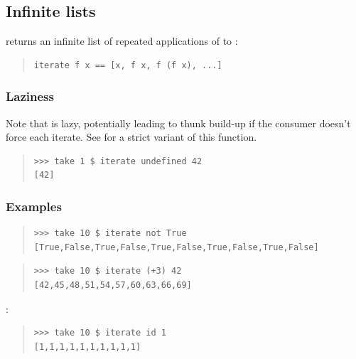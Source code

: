 \subsection{Infinite lists}
\begin{haddockdesc}
\item[\begin{tabular}{@{}l}
iterate :: (a -> a) -> a -> {\char 91}a{\char 93}
\end{tabular}]
{\haddockbegindoc
{}  returns an infinite list of repeated applications
 of  to :\par
\begin{quote}
{\haddockverb\begin{verbatim}
iterate f x == [x, f x, f (f x), ...]\end{verbatim}}
\end{quote}
\subsubsection*{\textbf{Laziness}}
Note that  is lazy, potentially leading to thunk build-up if
 the consumer doesn't force each iterate. See  for a strict
 variant of this function.\par
\begin{quote}
{\haddockverb\begin{verbatim}
>>> take 1 $ iterate undefined 42
[42]

\end{verbatim}}
\end{quote}
\subsubsection*{\textbf{Examples}}
\begin{quote}
{\haddockverb\begin{verbatim}
>>> take 10 $ iterate not True
[True,False,True,False,True,False,True,False,True,False]

\end{verbatim}}
\end{quote}
\begin{quote}
{\haddockverb\begin{verbatim}
>>> take 10 $ iterate (+3) 42
[42,45,48,51,54,57,60,63,66,69]

\end{verbatim}}
\end{quote}
:\par
\begin{quote}
{\haddockverb\begin{verbatim}
>>> take 10 $ iterate id 1
[1,1,1,1,1,1,1,1,1,1]

\end{verbatim}}
\end{quote}}
\end{haddockdesc}
